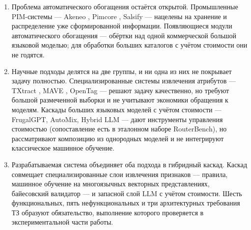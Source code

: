 \begin{enumerate}[label=\arabic*)]
    \item Проблема автоматического обогащения остаётся открытой. Промышленные PIM-системы — Akeneo \cite{ref_5}, Pimcore \cite{ref_6}, Salsify \cite{ref_7} — нацелены на хранение и распределение уже сформированной информации. Появляющиеся модули автоматического обогащения — обёртки над одной коммерческой большой языковой моделью; для обработки больших каталогов с учётом стоимости они не годятся.
    \item Научные подходы делятся на две группы, и ни одна из них не покрывает задачу полностью. Специализированные системы извлечения атрибутов — TXtract \cite{ref_23}, MAVE \cite{ref_24}, OpenTag \cite{ref_25} — решают задачу качественно, но требуют большой размеченной выборки и не учитывают экономики обращения к моделям. Каскады больших языковых моделей с учётом стоимости — FrugalGPT, AutoMix, Hybrid LLM — дают инструменты управления стоимостью (сопоставление есть в эталонном наборе RouterBench), но рассматривают композицию из однородных моделей и не интегрируют классическое машинное обучение.
    \item Разрабатываемая система объединяет оба подхода в гибридный каскад. Каскад совмещает специализированные слои извлечения признаков — правила, машинное обучение на многоязычных векторных представлениях, байесовский валидатор — и запасной слой LLM с учётом стоимости. Шесть функциональных, пять нефункциональных и три архитектурных требования ТЗ образуют обязательство, выполнение которого проверяется в экспериментальной части работы.
\end{enumerate}
